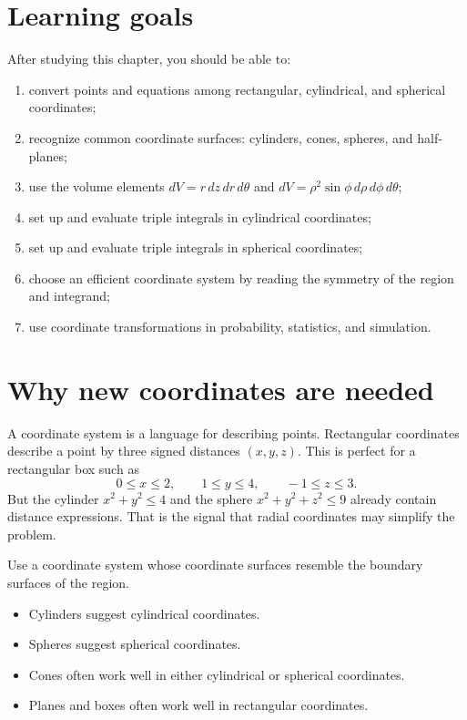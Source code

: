\documentclass[11pt,oneside]{book}
\begin{document}
\section{Learning goals}

After studying this chapter, you should be able to:
\begin{enumerate}
  \item convert points and equations among rectangular, cylindrical, and spherical coordinates;
  \item recognize common coordinate surfaces: cylinders, cones, spheres, and half-planes;
  \item use the volume elements $dV=r\,dz\,dr\,d\theta$ and $dV=\rho^2\sin\phi\,d\rho\,d\phi\,d\theta$;
  \item set up and evaluate triple integrals in cylindrical coordinates;
  \item set up and evaluate triple integrals in spherical coordinates;
  \item choose an efficient coordinate system by reading the symmetry of the region and integrand;
  \item use coordinate transformations in probability, statistics, and simulation.
\end{enumerate}

\section{Why new coordinates are needed}

A coordinate system is a language for describing points. Rectangular coordinates describe a point by three signed distances $(x,y,z)$. This is perfect for a rectangular box such as
\[
0\le x\le 2,\qquad 1\le y\le 4,\qquad -1\le z\le 3.
\]
But the cylinder $x^2+y^2\le 4$ and the sphere $x^2+y^2+z^2\le 9$ already contain distance expressions. That is the signal that radial coordinates may simplify the problem.

\begin{workflowbox}
Use a coordinate system whose coordinate surfaces resemble the boundary surfaces of the region.
\begin{itemize}
  \item Cylinders suggest cylindrical coordinates.
  \item Spheres suggest spherical coordinates.
  \item Cones often work well in either cylindrical or spherical coordinates.
  \item Planes and boxes often work well in rectangular coordinates.
\end{itemize}
\end{workflowbox}
\end{document}
